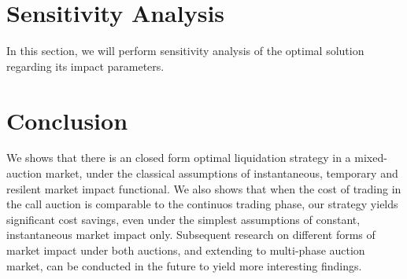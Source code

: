 \documentclass{article}
\begin{document}
\section{Sensitivity Analysis}\label{secSensitivityAnalysis}
In this section, we will perform sensitivity analysis of the optimal solution regarding its impact parameters.

\section{Conclusion}\label{secConclusion}
We shows that there is an closed form optimal liquidation strategy in a mixed-auction market, under the classical assumptions of instantaneous, temporary and resilent market impact functional. We also shows that when the cost of trading in the call auction is comparable to the continuos trading phase, our strategy yields significant cost savings, even under the simplest assumptions of constant, instantaneous market impact only. Subsequent research on different forms of market impact under both auctions, and extending to multi-phase auction market, can be conducted in the future to yield more interesting findings.



\end{document}
